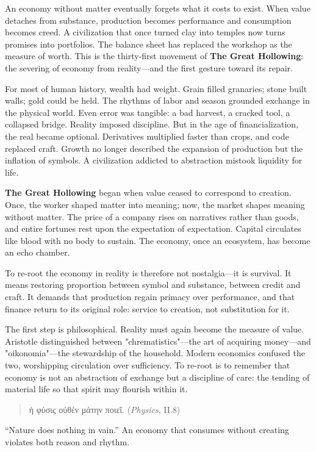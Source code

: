 \documentclass[11pt,twoside]{book}
\begin{document}
An economy without matter eventually forgets what it costs to exist.  
When value detaches from substance, production becomes performance and consumption becomes creed.  
A civilization that once turned clay into temples now turns promises into portfolios.  
The balance sheet has replaced the workshop as the measure of worth.  
This is the thirty-first movement of \textbf{The Great Hollowing}: the severing of economy from reality—and the first gesture toward its repair.

\bigskip

For most of human history, wealth had weight.  
Grain filled granaries; stone built walls; gold could be held.  
The rhythms of labor and season grounded exchange in the physical world.  
Even error was tangible: a bad harvest, a cracked tool, a collapsed bridge.  
Reality imposed discipline.  
But in the age of financialization, the real became optional.  
Derivatives multiplied faster than crops, and code replaced craft.  
Growth no longer described the expansion of production but the inflation of symbols.  
A civilization addicted to abstraction mistook liquidity for life.

\textbf{The Great Hollowing} began when value ceased to correspond to creation.  
Once, the worker shaped matter into meaning; now, the market shapes meaning without matter.  
The price of a company rises on narratives rather than goods, and entire fortunes rest upon the expectation of expectation.  
Capital circulates like blood with no body to sustain.  
The economy, once an ecosystem, has become an echo chamber.

To re-root the economy in reality is therefore not nostalgia—it is survival.  
It means restoring proportion between symbol and substance, between credit and craft.  
It demands that production regain primacy over performance, and that finance return to its original role: service to creation, not substitution for it.

\bigskip

The first step is philosophical.  
Reality must again become the measure of value.  
Aristotle distinguished between "chrematistics"—the art of acquiring money—and "oikonomia"—the stewardship of the household.  
Modern economics confused the two, worshipping circulation over sufficiency.  
To re-root is to remember that economy is not an abstraction of exchange but a discipline of care: the tending of material life so that spirit may flourish within it.  
\begin{quote}
\foreignlanguage{greek}{ἡ φύσις οὐθὲν μάτην ποιεῖ.}  
(\textit{Physics}, II.8)  
\end{quote}
“Nature does nothing in vain.”  
An economy that consumes without creating violates both reason and rhythm.
\end{document}
